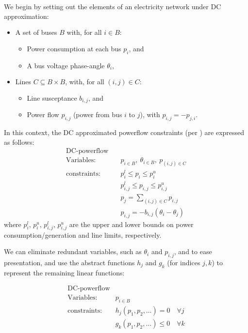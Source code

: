 We begin by setting out the elements of an electricity network under DC approximation:
\begin{itemize}
    \item A set of buses $B$ with, for all $i\in B$:
    \begin{itemize} 
        \item Power consumption at each bus $p_i$, and 
        \item A bus voltage phase-angle $\theta_i$,
    \end{itemize}
    \item Lines $C\subseteq B\times B$, with, for all $(i,j)\in C$: 
        \begin{itemize} 
        \item Line susceptance $b_{i,j}$, and 
        \item Power flow $p_{i,j}$ (power from bus $i$ to $j$), with $p_{i,j}=-p_{j,i}$. 
    \end{itemize}
\end{itemize}
In this context, the DC approximated powerflow constraints (per \cite{Wang1}) are expressed as follows:
\begin{equation}
\label{dcopf1}
\begin{aligned}
\text{DC-powerflow} \quad& \\
\text{Variables:} \quad&  p_{i\in B},\ \theta_{i\in B},\ p_{(i,j)\in C} \\
\text{constraints:} \quad& p_i^{l}\le p_i \le p_i^{u} \\
&p_{i,j}^l \le p_{i,j} \le p_{i,j}^u \\
&p_j = \sum_{(i,j)\in C}p_{i,j}\\
&p_{i,j} = -b_{i,j}(\theta_i - \theta_j)
\end{aligned}
\end{equation}
where $p_i^{l}$, $p_i^{u}$, $p_{i,j}^l$, $p_{i,j}^u$ are the upper and lower bounds on power consumption/generation and line limits, respectively.

We can eliminate redundant variables, such as $\theta_i$ and $p_{i,j}$, and to ease presentation, and use the abstract functions $h_j$ and $g_k$ (for indices $j,k$) to represent the remaining linear functions:

\begin{equation}
\label{dcopf2}
\begin{aligned}
\text{DC-powerflow}\\
\text{Variables:}\quad & p_{i\in B} \\
\text{constraints:}\quad & h_j(p_1,p_2,\dots)=0\quad \forall j\\
& g_k(p_1,p_2,\dots)\le 0 \quad \forall k
\end{aligned}
\end{equation}

